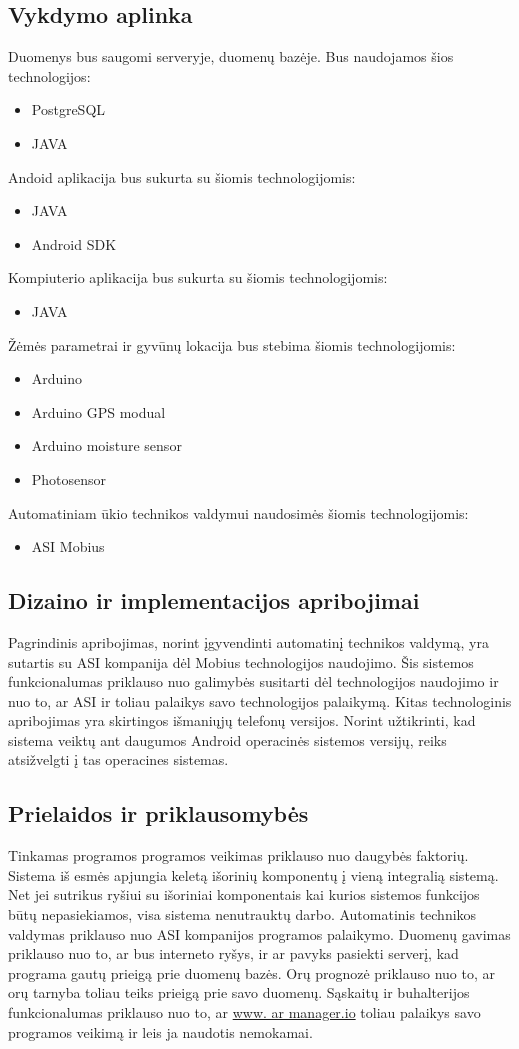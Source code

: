 \documentclass[oneside]{VUMIFPSkursinis}
\begin{document}
\subsection{Vykdymo aplinka}
Duomenys bus saugomi serveryje, duomenų bazėje. Bus naudojamos šios technologijos:
	\begin{itemize}
		\item PostgreSQL
		\item JAVA
	\end{itemize}
Andoid aplikacija bus sukurta su šiomis technologijomis:
	\begin{itemize}
		\item JAVA
		\item Android SDK
	\end{itemize}
Kompiuterio aplikacija bus sukurta su šiomis technologijomis:
	\begin{itemize}
		\item JAVA
	\end{itemize}
Žėmės parametrai ir gyvūnų lokacija bus stebima šiomis technologijomis:
	\begin{itemize}
		\item Arduino
		\item Arduino GPS modual
		\item Arduino moisture sensor
		\item Photosensor
	\end{itemize}
Automatiniam ūkio technikos valdymui naudosimės šiomis technologijomis:
	\begin{itemize}		
		\item ASI Mobius
	\end{itemize}
\subsection{Dizaino ir implementacijos apribojimai}
Pagrindinis apribojimas, norint įgyvendinti automatinį technikos valdymą, yra sutartis su ASI kompanija dėl Mobius technologijos naudojimo. Šis sistemos funkcionalumas priklauso nuo galimybės susitarti dėl technologijos naudojimo ir nuo to, ar ASI ir toliau palaikys savo technologijos palaikymą. Kitas technologinis apribojimas yra skirtingos išmaniųjų telefonų versijos. Norint užtikrinti, kad sistema veiktų ant daugumos Android operacinės sistemos versijų, reiks atsižvelgti į tas operacines sistemas. 


\subsection{Prielaidos ir priklausomybės}
Tinkamas programos programos veikimas priklauso nuo daugybės faktorių. Sistema iš esmės apjungia keletą išorinių komponentų į vieną integralią sistemą. Net jei sutrikus ryšiui su išoriniai komponentais kai kurios sistemos funkcijos būtų nepasiekiamos, visa sistema nenutrauktų darbo. Automatinis technikos valdymas priklauso nuo ASI kompanijos programos palaikymo. Duomenų gavimas priklauso nuo to, ar bus interneto ryšys, ir ar pavyks pasiekti serverį, kad programa gautų prieigą prie duomenų bazės. Orų prognozė priklauso nuo to, ar orų tarnyba toliau teiks prieigą prie savo duomenų. Sąskaitų ir buhalterijos funkcionalumas priklauso nuo to, ar \url{www. ar manager.io} toliau palaikys savo programos veikimą ir leis ja naudotis nemokamai.
\end{document}
